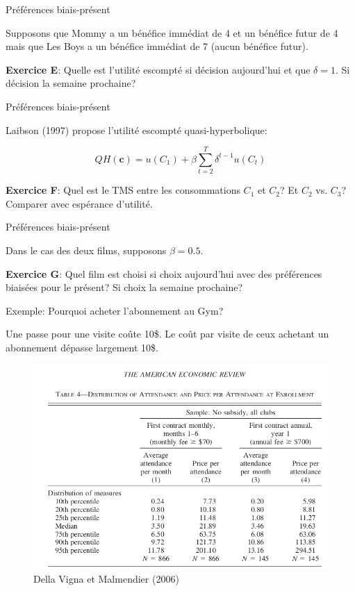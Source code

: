 \documentclass[handout]{beamer}
\begin{document}
\begin{frame}{Préférences biais-présent}

Supposons que Mommy a un bénéfice immédiat de 4 et un bénéfice futur de 4 mais que Les Boys a un bénéfice immédiat de 7 (aucun bénéfice futur). \vspace{0.25in}

\textbf{Exercice E}: Quelle est l'utilité escompté si décision aujourd'hui et que $\delta=1$. Si décision la semaine prochaine?

\end{frame}


\begin{frame}{Préférences biais-présent}

Laibson (1997) propose l'utilité escompté quasi-hyperbolique: 

$$QH(\mathbf{c}) = u(C_1) + \beta \sum_{t=2}^T \delta^{t-1} u(C_t)$$

\textbf{Exercice F}: Quel est le TMS entre les consommations $C_1$ et $C_2$? Et $C_2$ vs. $C_3$? Comparer avec espérance d'utilité.

\end{frame}

\begin{frame}{Préférences biais-présent}

Dans le cas des deux films, supposons $\beta=0.5$. 
\vspace{0.5in}

\textbf{Exercice G}: Quel film est choisi si choix aujourd'hui avec des préférences biaisées pour le présent? Si choix la semaine prochaine?

\end{frame}

\begin{frame}{Exemple: Pourquoi acheter l'abonnement au Gym?}

Une passe pour une visite coûte 10\$. Le coût par visite de ceux achetant un abonnement dépasse largement 10\$. 

\begin{figure}
\includegraphics[scale=0.3]{Gym.png}
\caption{Della Vigna et Malmendier (2006)}
\end{figure}

\end{frame}
\end{document}
